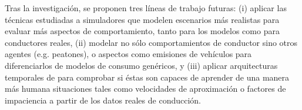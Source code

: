 \begin{fullwidth}
	Tras la investigación, se proponen tres líneas de trabajo futuras: (i) aplicar las técnicas estudiadas a simuladores que modelen escenarios más realistas para evaluar más aspectos de comportamiento, tanto para los modelos como para conductores reales, (ii) modelar no sólo comportamientos de conductor sino otros agentes (e.g. peatones), o aspectos como emisiones de vehículos para diferenciarlos de modelos de consumo genéricos, y (iii) aplicar arquitecturas temporales de  para comprobar si éstas son capaces de aprender de una manera más humana situaciones tales como velocidades de aproximación o factores de impaciencia a partir de los datos reales de conducción.
\end{fullwidth}
